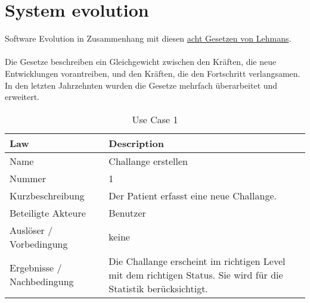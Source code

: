 \chapter{System evolution}

Software Evolution in Zusammenhang mit diesen \href{https://en.wikipedia.org/wiki/Lehman%27s_laws_of_software_evolution}{acht Gesetzen von Lehmans}. \\ \\

Die Gesetze beschreiben ein Gleichgewicht zwischen den Kräften, die neue Entwicklungen vorantreiben, und den Kräften, die den Fortschritt verlangsamen. In den letzten Jahrzehnten wurden die Gesetze mehrfach überarbeitet und erweitert.

\begin{table}[H]
 \caption{Use Case 1}
 \begin{tabularx}{\textwidth}{|l|X|}
     \hline
     \textbf{Law}       & \textbf{Description} \\
     \hline
     Name                       & Challange erstellen \\
     \hline
     Nummer                     & 1 \\
     \hline
     Kurzbeschreibung           & Der Patient erfasst eine neue Challange. \\
     \hline
     Beteiligte Akteure         & Benutzer \\
     \hline
     Ausl\"{o}ser / Vorbedingung    & keine \\
     \hline
     Ergebnisse / Nachbedingung & Die Challange erscheint im richtigen Level mit dem richtigen Status. Sie wird f\"{u}r die Statistik ber\"{u}cksichtigt. \\
     \hline
 \end{tabularx}
 \label{table: Use Case 1}
\end{table}
